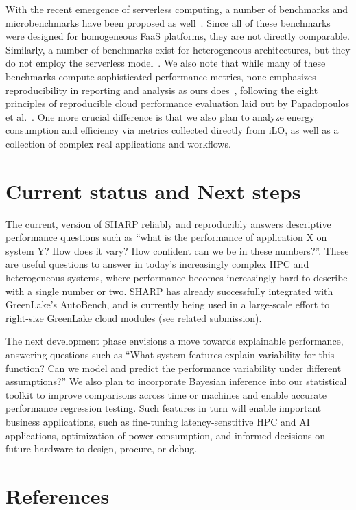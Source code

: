 \documentclass[11pt]{article}
\begin{document}
With the recent emergence of serverless computing, a number of benchmarks and microbenchmarks have been proposed as well~\cite{copik21:sebs, decker22:performance, hancock22:orcbench, kim19:practical, yu20:characterizing}.
Since all of these benchmarks were designed for homogeneous FaaS platforms, they are not directly comparable.
Similarly, a number of benchmarks exist for heterogeneous architectures, but they do not employ the serverless model~\cite{danalis10:scalable}.
We also note that while many of these benchmarks compute sophisticated performance metrics, none emphasizes reproducibility in reporting and analysis as ours does~\cite{scheuner20:review}, following the eight principles of reproducible cloud performance evaluation laid out by Papadopoulos et al.~\cite{papadopoulos19:methodological}.
One more crucial difference is that we also plan to analyze energy consumption and efficiency via metrics collected directly from iLO, as well as a collection of complex real applications and workflows.



\section*{Current status and Next steps}

The current, version of SHARP reliably and reproducibly answers descriptive performance questions such as ``what is the performance of application X on system Y? How does it vary? How confident can we be in these numbers?''.
These are useful questions to answer in today's increasingly complex HPC and heterogeneous systems, where performance becomes increasingly hard to describe with a single number or two.
SHARP has already successfully integrated with GreenLake's AutoBench, and is currently being used in a large-scale effort to right-size GreenLake cloud modules (see related submission).

The next development phase envisions a move towards explainable performance, answering questions such as ``What system features explain variability for this function? Can we model and predict the performance variability under different assumptions?''
We also plan to incorporate Bayesian inference into our statistical toolkit to improve comparisons across time or machines and enable accurate performance regression testing.
Such features in turn will enable important business applications, such as fine-tuning latency-senstitive HPC and AI applications, optimization of power consumption, and informed decisions on future hardware to design, procure, or debug.

\newpage
\section*{References}


  
\end{document}
